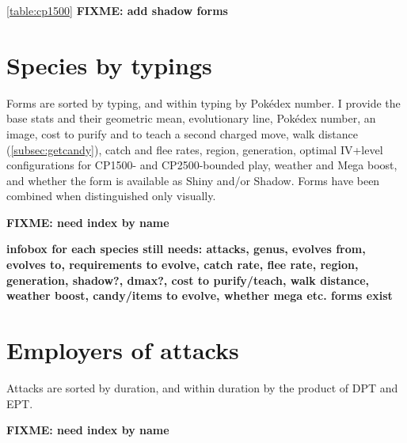 \documentclass[ebook,10pt,openany,oneside]{memoir}
\begin{document}
\autoref{table:cp1500}
\textbf{FIXME: add shadow forms}


\chapter{Species by typings}
\label{chap:speciesbytype}
Forms are sorted by typing, and within typing by Pokédex number.
I provide the base stats and their geometric mean, evolutionary line,
 Pokédex number, an image, cost to purify and to teach a second charged
 move, walk distance (\autoref{subsec:getcandy}), catch and flee rates,
 region, generation, optimal IV+level configurations for CP1500-
 and CP2500-bounded play, weather and Mega boost, and whether the
 form is available as Shiny and/or Shadow.
Forms have been combined when distinguished only visually.

\textbf{FIXME: need index by name}

\textbf{infobox for each species still needs: attacks, genus, evolves from, evolves to,
           requirements to evolve, catch rate, flee rate, region, generation, shadow?, dmax?,
           cost to purify/teach, walk distance, weather boost, candy/items to evolve,
           whether mega etc. forms exist}

\chapter{Employers of attacks}
\label{chap:attackemployers}
Attacks are sorted by duration, and within duration by the product of DPT and EPT.

\textbf{FIXME: need index by name}

\backmatter

\end{document}
